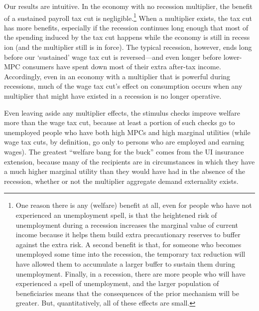 \documentclass[\econtexRoot/HAFiscal]{subfiles}
\begin{document}
Our results are intuitive.  In the economy with no recession multiplier, the benefit of a sustained payroll tax cut is negligible.\footnote{One reason there is any (welfare) benefit at all, even for people who have not experienced an unemployment spell, is that the heightened risk of unemployment during a recession increases the marginal value of current income because it helps them build extra precautionary reserves to buffer against the extra risk.  A second benefit is that, for someone who becomes unemployed some time into the recession, the temporary tax reduction will have allowed them to accumulate a larger buffer to sustain them during unemployment.  Finally, in a recession, there are more people who will have experienced a spell of unemployment, and the larger population of beneficiaries means that the consequences of the prior mechanism will be greater.  But, quantitatively, all of these effects are small.}
When a multiplier exists, the tax cut has more benefits, especially if the recession continues long enough that most of the spending induced by the tax cut happens while the economy is still in recess
ion (and the multiplier still is in force).  The typical recession, however, ends long before our `sustained' wage tax cut is reversed---and even longer before lower-MPC consumers have spent down most of their extra after-tax income. Accordingly, even in an economy with a multiplier that is powerful during recessions, much of the wage tax cut's effect on consumption occurs when any multiplier that might have existed in a recession is no longer operative.

Even leaving aside any multiplier effects, the stimulus checks improve welfare more than the wage tax cut, because at least a portion of such checks go to unemployed people who have both high MPCs and high marginal utilities (while wage tax cuts, by definition, go only to persons who are employed and earning wages). The greatest ``welfare bang for the buck'' comes from the UI insurance extension, because many of the recipients are in circumstances in which they have a much higher marginal utility than they would have had in the absence of the recession, whether or not the multiplier aggregate demand externality exists.
\end{document}
